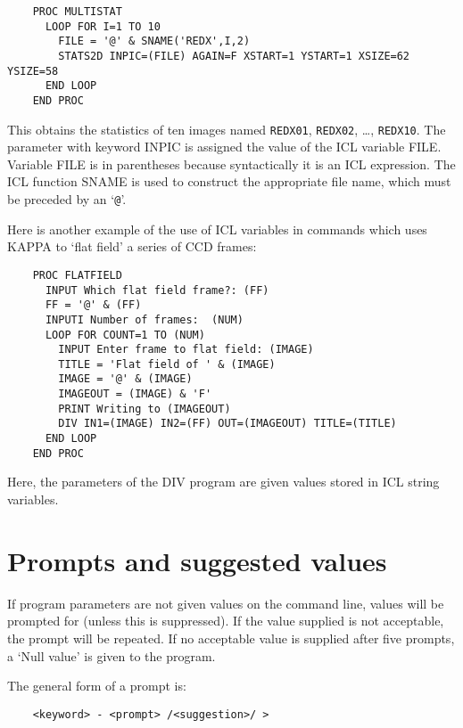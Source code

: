 \begin{small}
\begin{verbatim}
    PROC MULTISTAT
      LOOP FOR I=1 TO 10
        FILE = '@' & SNAME('REDX',I,2)
        STATS2D INPIC=(FILE) AGAIN=F XSTART=1 YSTART=1 XSIZE=62 YSIZE=58
      END LOOP
    END PROC
\end{verbatim}
\end{small}

This obtains the statistics of ten images named {\small\tt REDX01},
{\small\tt REDX02}, \dots, {\small\tt REDX10}.
The parameter with keyword INPIC is assigned the value of the ICL variable FILE.
Variable FILE is in parentheses because syntactically it is an ICL expression.
The ICL function SNAME is used to construct the appropriate file name, which must
be preceded by an `{\tt @}'.

Here is another example of the use of ICL variables in commands which uses KAPPA
to `flat field' a series of CCD frames:

\begin{small}
\begin{verbatim}
    PROC FLATFIELD
      INPUT Which flat field frame?: (FF)
      FF = '@' & (FF)
      INPUTI Number of frames:  (NUM)
      LOOP FOR COUNT=1 TO (NUM)
        INPUT Enter frame to flat field: (IMAGE)
        TITLE = 'Flat field of ' & (IMAGE)
        IMAGE = '@' & (IMAGE)
        IMAGEOUT = (IMAGE) & 'F'
        PRINT Writing to (IMAGEOUT)
        DIV IN1=(IMAGE) IN2=(FF) OUT=(IMAGEOUT) TITLE=(TITLE)
      END LOOP
    END PROC
\end{verbatim}
\end{small}

Here, the parameters of the DIV program are given values stored in ICL string
variables.

\section{Prompts and suggested values}
\label{S_pd}

If program parameters are not given values on the command line, values
will be prompted for (unless this is suppressed).
If the value supplied is not acceptable, the prompt will be repeated.
If no acceptable value is supplied after five prompts, a `Null value'
is given to the program.

The general form of a prompt is:

\begin{small}
\begin{verbatim}
    <keyword> - <prompt> /<suggestion>/ >
\end{verbatim}
\end{small}

